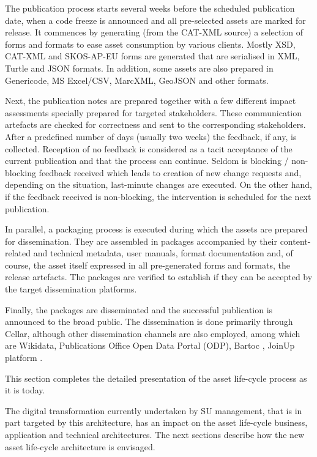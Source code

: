 	The publication process starts several weeks before the scheduled publication date, when a code freeze is announced and all pre-selected assets are marked for release. It commences by generating (from the CAT-XML source) a selection of forms and formats to ease asset consumption by various clients. Mostly XSD, CAT-XML and SKOS-AP-EU forms are generated that are serialised in XML, Turtle and JSON formats. In addition, some assets are also prepared in Genericode, MS Excel/CSV, MarcXML, GeoJSON and other formats. 
	
	Next, the publication notes are prepared together with a few different impact assessments specially prepared for targeted stakeholders. These communication artefacts are checked for correctness and sent to the corresponding stakeholders. After a predefined number of days (usually two weeks) the feedback, if any, is collected. Reception of no feedback is considered as a tacit acceptance of the current publication and that the process can continue. Seldom is blocking / non-blocking feedback received which leads to creation of new change requests and, depending on the situation, last-minute changes are executed. On the other hand, if the feedback received is non-blocking, the intervention is scheduled for the next publication. 
	
	In parallel, a packaging process is executed during which the assets are prepared for dissemination. They are assembled in packages accompanied by their content-related and technical metadata, user manuals, format documentation and, of course, the asset itself expressed in all pre-generated forms and formats, the release artefacts. The packages are verified to establish if they can be accepted by the target dissemination platforms.
	
	Finally, the packages are disseminated and the successful publication is announced to the broad public. The dissemination is done primarily through Cellar\citep{cdm-francesconi2015ontology}, although other dissemination channels are also employed, among which are Wikidata\citep{vrandevcic2014wikidata}, Publications Office Open Data Portal (ODP), Bartoc \citep{ledl2016describing}, JoinUp platform \citep{hillenius2013free}.
	
	This section completes the detailed presentation of the asset life-cycle process as it is today. 
	
	The digital transformation currently undertaken by SU management, that is in part targeted by this architecture, has an impact on the asset life-cycle business, application and technical architectures. The next sections describe how the new asset life-cycle architecture is envisaged. 
		
